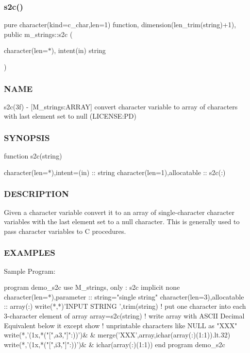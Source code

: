 \mbox{\label{namespacem__strings_a9a3d38d8e7c4212d63487b9b46bec3b7}} 
\subsubsection{\texorpdfstring{s2c()}{s2c()}}
{\footnotesize\ttfamily pure character(kind=c\+\_\+char,len=1) function, dimension(len\+\_\+trim(string)+1), public m\+\_\+strings\+::s2c (\begin{DoxyParamCaption}\item[{character(len=$\ast$), intent(in)}]{string }\end{DoxyParamCaption})}



\subsubsection*{N\+A\+ME}

s2c(3f) -\/ \mbox{[}M\+\_\+strings\+:A\+R\+R\+AY\mbox{]} convert character variable to array of characters with last element set to null (L\+I\+C\+E\+N\+SE\+:PD) 

\subsubsection*{S\+Y\+N\+O\+P\+S\+IS}

\begin{DoxyVerb}function s2c(string)

 character(len=*),intent=(in)  :: string
 character(len=1),allocatable  :: s2c(:)
\end{DoxyVerb}
 \subsubsection*{D\+E\+S\+C\+R\+I\+P\+T\+I\+ON}

Given a character variable convert it to an array of single-\/character character variables with the last element set to a null character. This is generally used to pass character variables to C procedures. \subsubsection*{E\+X\+A\+M\+P\+L\+ES}

\begin{DoxyVerb}Sample Program:

    program demo_s2c
    use M_strings, only : s2c
    implicit none
    character(len=*),parameter   :: string="single string"
    character(len=3),allocatable :: array(:)
       write(*,*)'INPUT STRING ',trim(string)
       ! put one character into each 3-character element of array
       array=s2c(string)
       ! write array with ASCII Decimal Equivalent below it except show
       ! unprintable characters like NULL as "XXX"
       write(*,'(1x,*("[",a3,"]":))')&
            & merge('XXX',array,ichar(array(:)(1:1)).lt.32)
       write(*,'(1x,*("[",i3,"]":))')&
            & ichar(array(:)(1:1))
    end program demo_s2c
\end{DoxyVerb}


